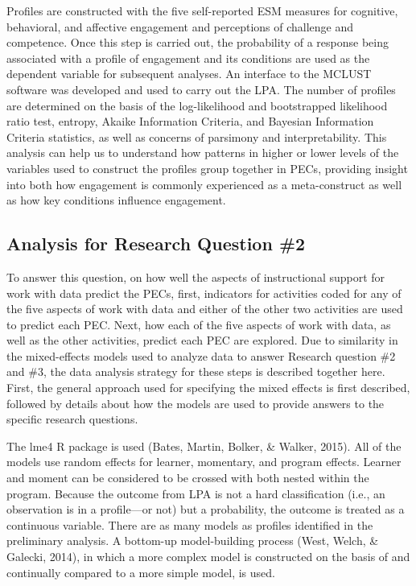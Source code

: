 \documentclass[]{msu-thesis}
\theoremstyle{definition}
\theoremstyle{definition}
\theoremstyle{definition}
\theoremstyle{remark}
\begin{document}
Profiles are constructed with the five self-reported ESM measures for
cognitive, behavioral, and affective engagement and perceptions of
challenge and competence. Once this step is carried out, the probability
of a response being associated with a profile of engagement and its
conditions are used as the dependent variable for subsequent analyses.
An interface to the MCLUST software was developed and used to carry out
the LPA. The number of profiles are determined on the basis of the
log-likelihood and bootstrapped likelihood ratio test, entropy, Akaike
Information Criteria, and Bayesian Information Criteria statistics, as
well as concerns of parsimony and interpretability. This analysis can
help us to understand how patterns in higher or lower levels of the
variables used to construct the profiles group together in PECs,
providing insight into both how engagement is commonly experienced as a
meta-construct as well as how key conditions influence engagement.

\subsection{Analysis for Research Question
\#2}\label{analysis-for-research-question-2}

To answer this question, on how well the aspects of instructional
support for work with data predict the PECs, first, indicators for
activities coded for any of the five aspects of work with data and
either of the other two activities are used to predict each PEC. Next,
how each of the five aspects of work with data, as well as the other
activities, predict each PEC are explored. Due to similarity in the
mixed-effects models used to analyze data to answer Research question
\#2 and \#3, the data analysis strategy for these steps is described
together here. First, the general approach used for specifying the mixed
effects is first described, followed by details about how the models are
used to provide answers to the specific research questions.

The lme4 R package is used (Bates, Martin, Bolker, \& Walker, 2015). All
of the models use random effects for learner, momentary, and program
effects. Learner and moment can be considered to be crossed with both
nested within the program. Because the outcome from LPA is not a hard
classification (i.e., an observation is in a profile---or not) but a
probability, the outcome is treated as a continuous variable. There are
as many models as profiles identified in the preliminary analysis. A
bottom-up model-building process (West, Welch, \& Galecki, 2014), in
which a more complex model is constructed on the basis of and
continually compared to a more simple model, is used.
\end{document}

